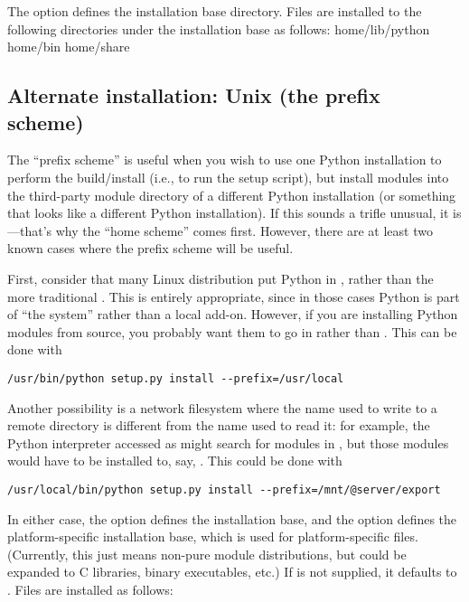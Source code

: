 \documentclass{howto}
\begin{document}
The  option defines the installation base directory.  Files
are installed to the following directories under the installation base
as follows:
              {home}{/lib/python}
              {home}{/bin}
              {home}{/share}

\subsection{Alternate installation: Unix (the prefix scheme)}
\label{sec:alt-unix-home}

The ``prefix scheme'' is useful when you wish to use one Python
installation to perform the build/install (i.e., to run the setup
script), but install modules into the third-party module directory of a
different Python installation (or something that looks like a different
Python installation).  If this sounds a trifle unusual, it is---that's
why the ``home scheme'' comes first.  However, there are at least two
known cases where the prefix scheme will be useful.

First, consider that many Linux distribution put Python in ,
rather than the more traditional .  This is entirely
appropriate, since in those cases Python is part of ``the system''
rather than a local add-on.  However, if you are installing Python
modules from source, you probably want them to go in
 rather than
.  This can be done with
\begin{verbatim}
/usr/bin/python setup.py install --prefix=/usr/local
\end{verbatim}

Another possibility is a network filesystem where the name used to write
to a remote directory is different from the name used to read it: for
example, the Python interpreter accessed as 
might search for modules in ,
but those modules would have to be installed to, say,
.  This
could be done with
\begin{verbatim}
/usr/local/bin/python setup.py install --prefix=/mnt/@server/export
\end{verbatim}

In either case, the  option defines the installation
base, and the  option defines the platform-specific
installation base, which is used for platform-specific files.
(Currently, this just means non-pure module distributions, but could be
expanded to C libraries, binary executables, etc.)  If
 is not supplied, it defaults to .
Files are installed as follows:
\end{document}
